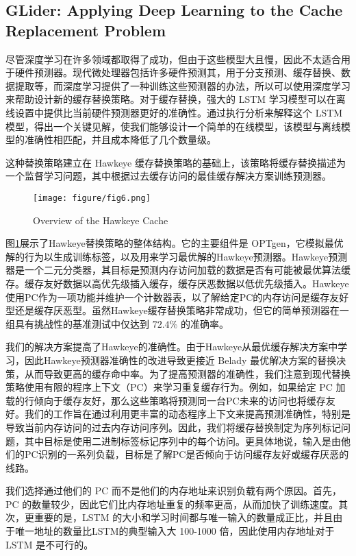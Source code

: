 \documentclass[10pt,journal,compsoc]{IEEEtran}
\begin{document}
\subsection{GLider: Applying Deep Learning to the Cache Replacement Problem}

尽管深度学习在许多领域都取得了成功，但由于这些模型大且慢，因此不太适合用于硬件预测器。现代微处理器包括许多硬件预测其，用于分支预测、缓存替换、数据提取等，而深度学习提供了一种训练这些预测器的办法，所以可以使用深度学习来帮助设计新的缓存替换策略。对于缓存替换，强大的 LSTM 学习模型可以在离线设置中提供比当前硬件预测器更好的准确性。通过执行分析来解释这个 LSTM 模型，得出一个关键见解，使我们能够设计一个简单的在线模型，该模型与离线模型的准确性相匹配，并且成本降低了几个数量级。

这种替换策略建立在 Hawkeye 缓存替换策略的基础上，该策略将缓存替换描述为一个监督学习问题，其中根据过去缓存访问的最佳缓存解决方案训练预测器。

\begin{figure}[!t]
\centering
\texttt{[image: figure/fig6.png]}
\caption{Overview of the Hawkeye Cache}
\label{fig_6}
\end{figure}


图\ref{fig_6}展示了Hawkeye替换策略的整体结构。它的主要组件是 OPTgen，它模拟最优解的行为以生成训练标签，以及用来学习最优解的Hawkeye预测器。Hawkeye预测器是一个二元分类器，其目标是预测内存访问加载的数据是否有可能被最优算法缓存。缓存友好数据以高优先级插入缓存，缓存厌恶数据以低优先级插入。Hawkeye使用PC作为一项功能并维护一个计数器表，以了解给定PC的内存访问是缓存友好型还是缓存厌恶型。虽然Hawkeye缓存替换策略非常成功，但它的简单预测器在一组具有挑战性的基准测试中仅达到 $72.4\%$ 的准确率。

我们的解决方案提高了Hawkeye的准确性。由于Hawkeye从最优缓存解决方案中学习，因此Hawkeye预测器准确性的改进导致更接近 Belady 最优解决方案的替换决策，从而导致更高的缓存命中率。为了提高预测器的准确性，我们注意到现代替换策略使用有限的程序上下文（PC）来学习重复缓存行为。例如，如果给定 PC 加载的行倾向于缓存友好，那么这些策略将预测同一台PC未来的访问也将缓存友好。我们的工作旨在通过利用更丰富的动态程序上下文来提高预测准确性，特别是导致当前内存访问的过去内存访问序列。因此，我们将缓存替换制定为序列标记问题，其中目标是使用二进制标签标记序列中的每个访问。更具体地说，输入是由他们的PC识别的一系列负载，目标是了解PC是否倾向于访问缓存友好或缓存厌恶的线路。

我们选择通过他们的 PC 而不是他们的内存地址来识别负载有两个原因。首先，PC 的数量较少，因此它们比内存地址重复的频率更高，从而加快了训练速度。其次，更重要的是，LSTM 的大小和学习时间都与唯一输入的数量成正比，并且由于唯一地址的数量比LSTM的典型输入大 100-1000 倍，因此使用内存地址对于 LSTM 是不可行的。
\end{document}
